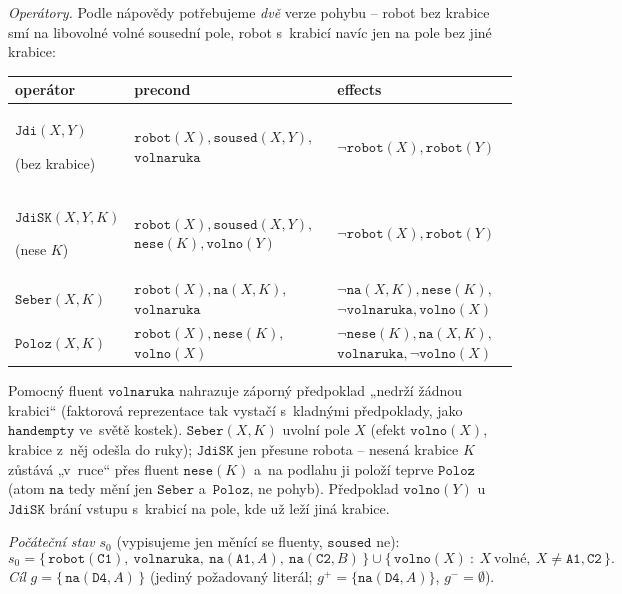 \begin{priklad}
\emph{Operátory.} Podle nápovědy potřebujeme \emph{dvě} verze pohybu -- robot bez krabice smí na libovolné volné sousední pole, robot s~krabicí navíc jen na pole bez jiné krabice:
\begin{center}\small
\begin{tabular}{@{}p{3.0cm}p{4.6cm}p{6.4cm}@{}}
\toprule
operátor & precond & effects \\
\midrule
$\mathtt{Jdi}(X,Y)$ \par\footnotesize(bez krabice) & $\mathtt{robot}(X),\mathtt{soused}(X,Y),$ $\mathtt{volnaruka}$ & $\neg\mathtt{robot}(X),\mathtt{robot}(Y)$ \\[2pt]
$\mathtt{JdiSK}(X,Y,K)$ \par\footnotesize(nese $K$) & $\mathtt{robot}(X),\mathtt{soused}(X,Y),$ $\mathtt{nese}(K),\mathtt{volno}(Y)$ & $\neg\mathtt{robot}(X),\mathtt{robot}(Y)$ \\[2pt]
$\mathtt{Seber}(X,K)$ & $\mathtt{robot}(X),\mathtt{na}(X,K),$ $\mathtt{volnaruka}$ & $\neg\mathtt{na}(X,K),\mathtt{nese}(K),$ $\neg\mathtt{volnaruka},\mathtt{volno}(X)$ \\[2pt]
$\mathtt{Poloz}(X,K)$ & $\mathtt{robot}(X),\mathtt{nese}(K),$ $\mathtt{volno}(X)$ & $\neg\mathtt{nese}(K),\mathtt{na}(X,K),$ $\mathtt{volnaruka},\neg\mathtt{volno}(X)$ \\
\bottomrule
\end{tabular}
\end{center}
Pomocný fluent $\mathtt{volnaruka}$ nahrazuje záporný předpoklad „nedrží žádnou krabici`` (faktorová reprezentace tak vystačí s~kladnými předpoklady, jako $\mathtt{handempty}$ ve~světě kostek). $\mathtt{Seber}(X,K)$ uvolní pole $X$ (efekt $\mathtt{volno}(X)$, krabice z~něj odešla do ruky); $\mathtt{JdiSK}$ jen přesune robota -- nesená krabice $K$ zůstává „v~ruce`` přes fluent $\mathtt{nese}(K)$ a~na podlahu ji položí teprve $\mathtt{Poloz}$ (atom $\mathtt{na}$ tedy mění jen $\mathtt{Seber}$ a~$\mathtt{Poloz}$, ne pohyb). Předpoklad $\mathtt{volno}(Y)$ u~$\mathtt{JdiSK}$ brání vstupu s~krabicí na pole, kde už leží jiná krabice.

\emph{Počáteční stav} $s_0$ (vypisujeme jen měnící se fluenty, $\mathtt{soused}$ ne):
\[ s_0=\{\,\mathtt{robot}(\mathtt{C1}),\ \mathtt{volnaruka},\ \mathtt{na}(\mathtt{A1},A),\ \mathtt{na}(\mathtt{C2},B)\,\}\cup\{\,\mathtt{volno}(X)\ :\ X\ \text{volné},\ X\neq \mathtt{A1},\mathtt{C2}\,\}. \]
\emph{Cíl} $g=\{\,\mathtt{na}(\mathtt{D4},A)\,\}$ (jediný požadovaný literál; $g^{+}=\{\mathtt{na}(\mathtt{D4},A)\}$, $g^{-}=\emptyset$).


\end{priklad}
